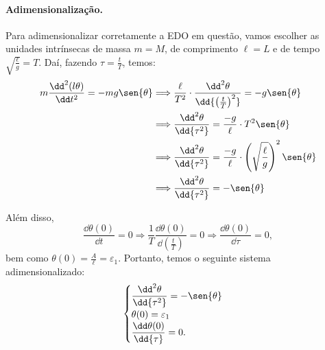 \begin{solution}
\paragraph{\small Adimensionalização.}

Para adimensionalizar corretamente a EDO em questão, vamos escolher as unidades
intrínsecas de massa $m = M$, de comprimento $\ell = L$ e de tempo 
$\sqrt{\frac{\ell}{g}} = T$.
Daí, fazendo $ \tau = \frac{t}{T} $, temos:
\begin{align*}
 m\dfrac{\dd^{2}(l\theta)}{\dd t^2} = -mg\sen{\theta} 
	&\Longrightarrow
	\frac{\ell}{T^2}\cdot \frac{\dd^2{\theta}}{\dd{\left(\frac{t}{T}\right)^2}} = -g\sen{\theta}\\
	&\Longrightarrow
	\frac{\dd^2{\theta}}{\dd{\tau^2}} = \frac{-g}{\ell}\cdot T^2\sen{\theta}\\
	&\Longrightarrow
	\frac{\dd^2{\theta}}{\dd{\tau^2}} = \frac{-g}{\ell}\cdot \left(\sqrt{\frac{\ell}{g}}\right)^2\sen{\theta}\\
	&\Longrightarrow
	\frac{\dd^2{\theta}}{\dd{\tau^2}} = -\sen{\theta}
\end{align*}

Além disso, 
\[
 \frac{\dd\theta(0)}{\dd{t}} = 0 
	\Longrightarrow \frac{1}{T}\frac{\dd\theta(0)}{\dd{\left(\frac{t}{T}\right)}} = 0
	\Longrightarrow \frac{\dd\theta(0)}{\dd{\tau}} = 0,
\]
bem como $\theta (0) =\frac{A}{\ell} = \varepsilon_1$.
Portanto, temos o seguinte sistema adimensionalizado:
\begin{equation}
 \begin{cases}
	 \dfrac{\dd^2{\theta}}{\dd{\tau^2}} = -\sen{\theta}\\
		\theta (0) = \varepsilon_1\\
		\dfrac{\dd\theta(0)}{\dd{\tau}} = 0.
	\end{cases}
\label{eq:edo-adim}
\end{equation}
%

\end{solution}
